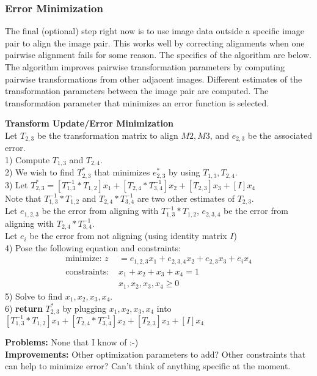 \documentclass{article}
\begin{document}
\subsubsection{Error Minimization}
The final (optional) step right now is to use image data outside a specific image pair to align the image pair. This works well by correcting alignments when one pairwise alignment fails for some reason. The specifics of the algorithm are below. The algorithm improves pairwise transformation parameters by computing pairwise transformations from other adjacent images. Different estimates of the transformation parameters between the image pair are computed. The transformation parameter that minimizes an error function is selected. \\
	\begin{algorithm}
	\DontPrintSemicolon
	\textbf{Transform Update/Error Minimization}\\
	Let $T_{2,3}$ be the transformation matrix to align $M2, M3$, and $e_{2,3}$ be the associated error.\\
	1) Compute $T_{1,3}$ and $T_{2,4}$.\\
	2) We wish to find $T_{2,3}^{*}$ that minimizes $e_{2,3}^{*}$ by using $T_{1,3},T_{2,4}$.\\
	3) Let $T_{2,3}^{*} = [T_{1,3}^{-1}*T_{1,2}]x_1 + [T_{2,4}*T_{3,4}^{-1}]x_2 + [T_{2,3}]x_3 + [I]x_4$\\
	Note that $T_{1,3}^{-1}*T_{1,2}$ and $T_{2,4}*T_{3,4}^{-1}$ are two other estimates of $T_{2,3}$.\\
	Let $e_{1,2,3}$ be the error from aligning with $T_{1,3}^{-1}*T_{1,2}$, $e_{2,3,4}$ be the error from aligning with $T_{2,4}*T_{3,4}^{-1}$.\\
	Let $e_i$ be the error from not aligning (using identity matrix $I$) \\
 	4) Pose the following equation and constraints:
	\begin{align*}
	 \text{minimize: } z &= e_{1,2,3}x_1 +  e_{2,3,4}x_2 + e_{2,3}x_3 + e_ix_4\\
	 \text{constraints: }&x_1 + x_2 + x_3 + x_4 = 1\\
	 &x_1, x_2, x_3, x_4 \ge 0
	\end{align*}
	5) Solve to find $x_1, x_2, x_3, x_4$.\\
	6) \textbf{return} $T_{2,3}^{*}$ by plugging $x_1, x_2, x_3, x_4$ into $[T_{1,3}^{-1}*T_{1,2}]x_1 + [T_{2,4}*T_{3,4}^{-1}]x_2 + [T_{2,3}]x_3 + [I]x_4$
	\end{algorithm}
	
\textbf{Problems:} None that I know of :-)\\
\textbf{Improvements:} Other optimization parameters to add? Other constraints that can help to minimize error? Can't think of anything specific at the moment.
\end{document}
